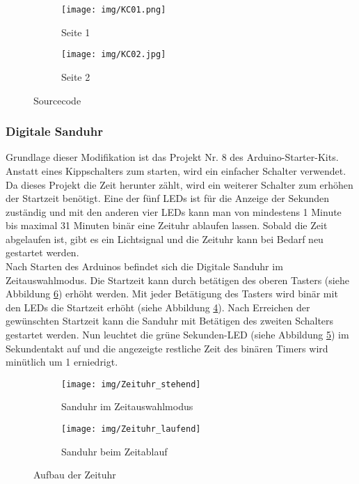 \begin{figure}[h]
	\centering
	\begin{subfigure}[b]{0.48\linewidth}
		\centering
		\texttt{[image: img/KC01.png]}
		\caption{Seite 1}\label{stehend}
	\end{subfigure}\enspace%
	\begin{subfigure}[b]{0.48\linewidth}
		\centering
		\texttt{[image: img/KC02.jpg]}
		\caption{Seite 2}\label{laufend}
	\end{subfigure}
	\caption{Sourcecode}\label{Zeituhr}
\end{figure}

\subsubsection{Digitale Sanduhr}
Grundlage dieser Modifikation ist das Projekt Nr. 8 des Arduino-Starter-Kits. Anstatt eines Kippschalters zum starten, wird ein einfacher Schalter verwendet. Da dieses Projekt die Zeit herunter zählt, wird ein weiterer Schalter zum erhöhen der Startzeit benötigt. Eine der fünf LEDs ist für die Anzeige der Sekunden zuständig und mit den anderen vier LEDs kann man von mindestens 1 Minute bis maximal 31 Minuten binär eine Zeituhr ablaufen lassen. Sobald die Zeit abgelaufen ist, gibt es ein Lichtsignal und die Zeituhr kann bei Bedarf neu gestartet werden.\\
Nach Starten des Arduinos befindet sich die Digitale Sanduhr im Zeitauswahlmodus. Die Startzeit kann durch betätigen des oberen Tasters (siehe Abbildung \ref{Zeituhr}) erhöht werden. Mit jeder Betätigung des Tasters wird binär mit den LEDs die Startzeit erhöht (siehe Abbildung \ref{stehend}). Nach Erreichen der gewünschten Startzeit kann die Sanduhr mit Betätigen des zweiten Schalters gestartet werden. Nun leuchtet die grüne Sekunden-LED (siehe Abbildung \ref{laufend}) im Sekundentakt auf und die angezeigte restliche Zeit des binären Timers wird minütlich um 1 erniedrigt.\\

\begin{figure}[h]
	\centering
	\begin{subfigure}[b]{0.48\linewidth}
		\centering
		\texttt{[image: img/Zeituhr\_stehend]}
		\caption{Sanduhr im Zeitauswahlmodus}\label{stehend}
	\end{subfigure}\enspace%
	\begin{subfigure}[b]{0.48\linewidth}
		\centering
		\texttt{[image: img/Zeituhr\_laufend]}
		\caption{Sanduhr beim Zeitablauf}\label{laufend}
	\end{subfigure}
	\caption{Aufbau der Zeituhr}\label{Zeituhr}
\end{figure}

